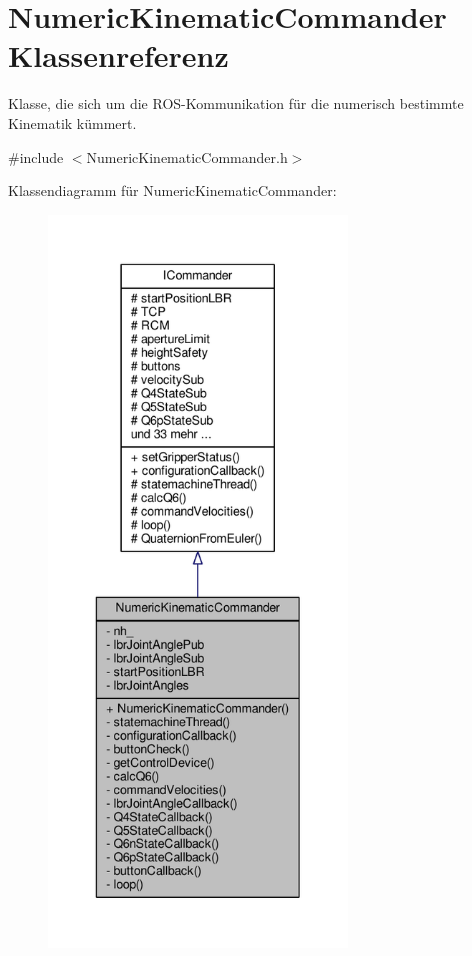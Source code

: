 \hypertarget{classNumericKinematicCommander}{\section{Numeric\-Kinematic\-Commander Klassenreferenz}
\label{classNumericKinematicCommander}
}


Klasse, die sich um die R\-O\-S-\/\-Kommunikation für die numerisch bestimmte Kinematik kümmert.  




{\ttfamily \#include $<$Numeric\-Kinematic\-Commander.\-h$>$}



Klassendiagramm für Numeric\-Kinematic\-Commander\-:
\nopagebreak
\begin{figure}[H]
\begin{center}
\leavevmode
\includegraphics[height=550pt]{classNumericKinematicCommander__inherit__graph}
\end{center}
\end{figure}


